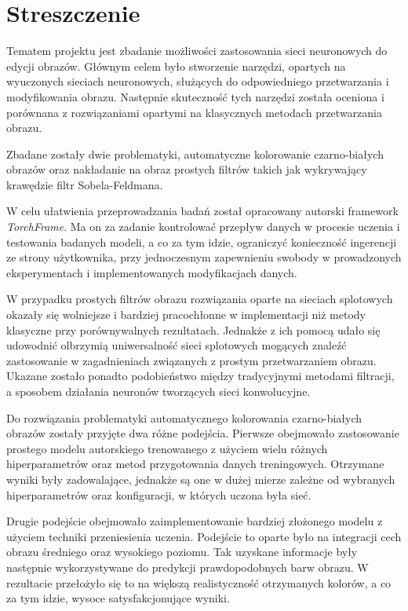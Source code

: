 \section*{Streszczenie}

  Tematem projektu jest zbadanie możliwości zastosowania sieci neuronowych do
  edycji obrazów. Głównym celem było stworzenie narzędzi, opartych na wyuczonych
  sieciach neuronowych, służących do odpowiedniego przetwarzania i
  modyfikowania obrazu. Następnie skuteczność tych narzędzi została oceniona i
  porównana z rozwiązaniami opartymi na klasycznych metodach przetwarzania obrazu.

  Zbadane zostały dwie problematyki, automatyczne kolorowanie czarno-białych obrazów
  oraz nakładanie na obraz prostych filtrów takich jak wykrywający
  krawędzie filtr Sobela-Feldmana.

  W celu ułatwienia przeprowadzania badań został opracowany autorski framework
  \textit{TorchFrame}. Ma on za zadanie kontrolować
  przepływ danych w procesie uczenia i testowania badanych modeli, a co za tym
  idzie, ograniczyć konieczność ingerencji ze strony użytkownika, przy jednoczesnym
  zapewnieniu swobody w prowadzonych eksperymentach i implementowanych modyfikacjach danych.

  W przypadku prostych filtrów obrazu rozwiązania
  oparte na sieciach splotowych okazały się wolniejsze i bardziej pracochłonne w
  implementacji niż metody klasyczne przy porównywalnych rezultatach. Jednakże
  z ich pomocą udało się udowodnić olbrzymią uniwersalność sieci splotowych
  mogących znaleźć zastosowanie w zagadnieniach związanych z prostym
  przetwarzaniem obrazu. Ukazane zostało ponadto podobieństwo między tradycyjnymi
  metodami filtracji, a sposobem działania neuronów tworzących sieci konwolucyjne.

  Do rozwiązania problematyki automatycznego kolorowania czarno-białych
  obrazów zostały przyjęte dwa różne podejścia. Pierwsze obejmowało
  zastosowanie prostego modelu autorskiego trenowanego z użyciem wielu różnych
  hiperparametrów oraz metod przygotowania danych treningowych.
  Otrzymane wyniki były zadowalające,
  jednakże są one w dużej mierze zależne od wybranych hiperparametrów oraz
  konfiguracji, w których uczona była sieć.

  Drugie podejście obejmowało zaimplementowanie bardziej złożonego modelu
  z użyciem techniki przeniesienia uczenia. Podejście to oparte
  było na integracji cech obrazu średniego oraz wysokiego poziomu.
  Tak uzyskane informacje były następnie wykorzystywane do predykcji
  prawdopodobnych barw obrazu.
  W rezultacie przełożyło się to na większą realistyczność otrzymanych kolorów,
  a co za tym idzie, wysoce satysfakcjonujące wyniki.

